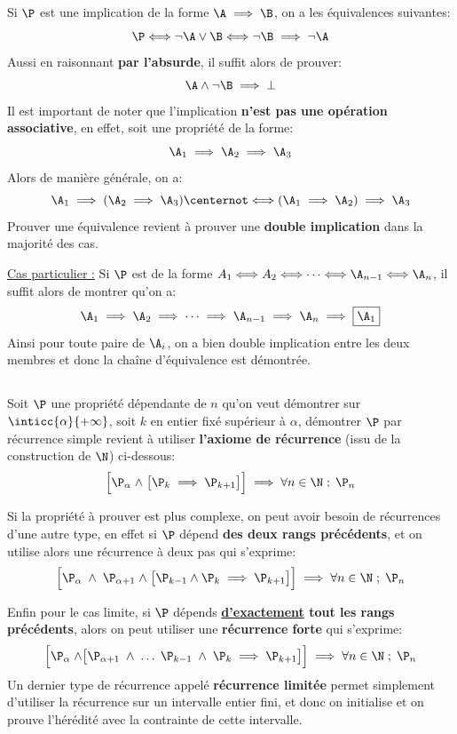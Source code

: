 \subsection*{}
Si \(\P\) est une implication de la forme \(\A \implies \B\), on a les équivalences suivantes:
\[
   \P \Longleftrightarrow \lnot \A \lor \B \Longleftrightarrow \lnot \B \implies \lnot \A
\]
Aussi en raisonnant \textbf{par l'absurde}, il suffit alors de prouver:
\[
   \A \land \lnot \B \implies \bot 
\]
Il est important de noter que l'implication \textbf{n'est pas une opération associative}, en effet, soit une propriété de la forme:
\[
   \A_1 \implies \A_2 \implies \A_3
\]
Alors de manière générale, on a:
\[
   \A_1 \implies (\A_2 \implies \A_3) \centernot\Longleftrightarrow (\A_1 \implies \A_2) \implies \A_3
\]
Prouver une équivalence revient à prouver une \textbf{double implication} dans la majorité des cas.\<

\underline{Cas particulier {:}}
Si \(\P\) est de la forme \( A_1 \Longleftrightarrow A_2 \Longleftrightarrow \cdots \Longleftrightarrow \A_{n-1} \Longleftrightarrow \A_n \), il suffit alors de montrer qu'on a:
\[
   \A_1 \implies \A_2 \implies \cdots \implies \A_{n-1} \implies \A_n \implies \boxed{\A_1}
\]
Ainsi pour toute paire de \(\A_i\), on a bien double implication entre les deux membres et donc la chaîne d'équivalence est démontrée.
\subsection*{}
Soit \(\P\) une propriété dépendante de \(n\) qu'on veut démontrer sur \(\inticc{\alpha}{+\infty}\), soit \(k\) en entier fixé supérieur à \(\alpha\), démontrer \(\P\) par récurrence simple revient à utiliser \textbf{l'axiome de récurrence} (issu de la construction de \(\N\)) ci-dessous:
\[
   \Bigr[ \P_{\alpha} \; \land \; \bigr[ \P_{k} \implies \P_{k+1} \bigr] \Bigr] \implies \forall n \in \N \; ; \; \P_n   
\]

Si la propriété à prouver est plus complexe, on peut avoir besoin de récurrences d'une autre type, en effet si \(\P\) dépend \textbf{des deux rangs précédents}, et on utilise alors une récurrence à deux pas qui s'exprime:
\[
   \Bigr[ \P_{\alpha} \; \land \; \P_{\alpha + 1} \; \land \; \bigr[ \P_{k-1}  \land \P_{k}\implies \P_{k+1} \bigr] \Bigr] \implies \forall n \in \N \; ; \; \P_n   
\]

Enfin pour le cas limite, si \(\P\) dépends \textbf{\underline{d'exactement} tout les rangs précédents}, alors on peut utiliser une \textbf{récurrence forte} qui s'exprime:
\[
   \Bigr[ \P_{\alpha} \; \land \bigr[ \P_{\alpha + 1} \; \land \; \ldots \; \P_{k-1} \; \land \; \P_{k} \implies \P_{k+1}  \bigr] \Bigr] \implies \forall n \in \N \; ; \; \P_n   
\]
Un dernier type de récurrence appelé \textbf{récurrence limitée} permet simplement d'utiliser la récurrence sur un intervalle entier fini, et donc on initialise et on prouve l'hérédité avec la contrainte de cette intervalle.\<



